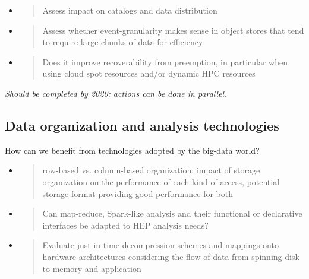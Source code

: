 \documentclass[12pt,a4paper]{article}
\begin{document}
\begin{itemize}
\item
  \begin{quote}
  \protect\hypertarget{_ox25y1bzr703}{}{}Assess impact on catalogs and
  data distribution
  \end{quote}
\end{itemize}

\begin{itemize}
\item
  \begin{quote}
  \protect\hypertarget{_hhvd696t4e1b}{}{}Assess whether
  event-granularity makes sense in object stores that tend to require
  large chunks of data for efficiency
  \end{quote}
\item
  \begin{quote}
  \protect\hypertarget{_hut1j5u624ly}{}{}Does it improve recoverability
  from preemption, in particular when using cloud spot resources and/or
  dynamic HPC resources
  \end{quote}
\end{itemize}

\emph{Should be completed by
2020: actions can be done in parallel}.

\subsection{Data organization and analysis
technologies}\label{data-organization-and-analysis}
How can we benefit from technologies adopted by the
big-data world?

\begin{itemize}
\item
  \begin{quote}
  \protect\hypertarget{_2uzvesmlywml}{}{}row-based vs. column-based
  organization: impact of storage organization on the performance of
  each kind of access, potential storage format providing good
  performance for both
  \end{quote}
\item
  \begin{quote}
  \protect\hypertarget{_6xwv25emxnty}{}{}Can map-reduce, Spark-like
  analysis and their functional or declarative interfaces be adapted to
  HEP analysis needs?
  \end{quote}
\item
  \begin{quote}
  \protect\hypertarget{_vfqvjf8nrae}{}{}Evaluate just in time
  decompression schemes and mappings onto hardware architectures
  considering the flow of data from spinning disk to memory and
  application
  \end{quote}
\end{itemize}
\end{document}
